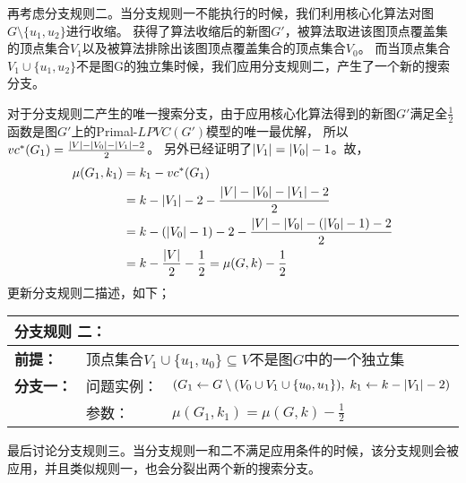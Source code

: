 \vspace{0.5cm}
再考虑分支规则二。当分支规则一不能执行的时候，我们利用核心化算法对图$G \setminus \{u_1, u_2\}$进行收缩。
获得了算法收缩后的新图$G'$，被算法取进该图顶点覆盖集的顶点集合$V_1$以及被算法排除出该图顶点覆盖集合的顶点集合$V_0$。
而当顶点集合$V_1 \cup \{u_1, u_2\}$不是图G的独立集时候，我们应用分支规则二，产生了一个新的搜索分支。

对于分支规则二产生的唯一搜索分支，由于应用核心化算法得到的新图$G'$满足全$\frac{1}{2}$函数是图$G'$上的Primal-$LPVC(G')$模型的唯一最优解，
所以$vc^*(G_1) = \frac{\left\vert V \right\vert - \left\vert V_0 \right\vert - \left\vert V_1 \right\vert - 2}{2}$。
另外已经证明了$\left\vert V_1 \right\vert = \left\vert V_0 \right\vert - 1$。故，
\begin{equation*} \begin{aligned}
    \mu(G_1, k_1) & = k_1 - vc^*(G_1)  \\
                  & = k - \left\vert V_1 \right\vert - 2 - \frac{\left\vert V \right\vert - \left\vert V_0 \right\vert - \left\vert V_1 \right\vert - 2}{2} \\
                  & = k - (\left\vert V_0 \right\vert - 1) - 2 - \frac{\left\vert V \right\vert - \left\vert V_0 \right\vert - (\left\vert V_0 \right\vert - 1) - 2}{2} \\
                  & = k - \frac{\left\vert V \right\vert}{2} - \frac{1}{2} = \mu(G, k) - \frac{1}{2}
\end{aligned} \end{equation*}
更新分支规则二描述，如下；\\

\begin{tabular}{ p{0.12\headwidth} | p{0.12\headwidth}p{0.66\headwidth} }
  \multicolumn{3}{l}{ \textbf{分支规则 二：} }\\
  \hline
  \textbf{前提：}  & \multicolumn{2}{l}{顶点集合$V_1 \cup \{u_1, u_0\}\subseteq V$不是图$G$中的一个独立集}\\
  \hline
  \textbf{分支一：} & 问题实例：&$(G_1 \leftarrow G \setminus (V_0 \cup V_1 \cup \{u_0, u_1\}),\; k_1 \leftarrow k - \left\vert V_1 \right\vert - 2)$ \\
                    & 参数：&$\mu(G_1, k_1) = \mu(G, k) - \frac{1}{2}$\\
  \hline
\end{tabular} \vspace{0.5cm}  

\vspace{0.5cm}
最后讨论分支规则三。当分支规则一和二不满足应用条件的时候，该分支规则会被应用，并且类似规则一，也会分裂出两个新的搜索分支。

